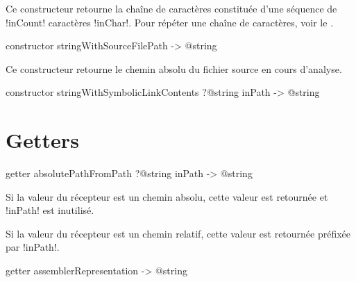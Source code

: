 Ce constructeur retourne la chaîne de caractères constituée d'une séquence de \ggs!inCount! caractères \ggs!inChar!. Pour répéter une chaîne de caractères, voir le .






\begin{galgasbox}
constructor stringWithSourceFilePath -> @string
\end{galgasbox}

Ce constructeur retourne le chemin absolu du fichier source en cours d'analyse.







\begin{galgasbox}
constructor stringWithSymbolicLinkContents ?@string inPath -> @string
\end{galgasbox}



















\section{Getters}


\begin{galgasbox}
getter absolutePathFromPath ?@string inPath -> @string
\end{galgasbox}

Si la valeur du récepteur est un chemin absolu, cette valeur est retournée et \ggs!inPath! est inutilisé.

Si la valeur du récepteur est un chemin relatif, cette valeur est retournée préfixée par \ggs!inPath!.





\begin{galgasbox}
getter assemblerRepresentation -> @string
\end{galgasbox}

